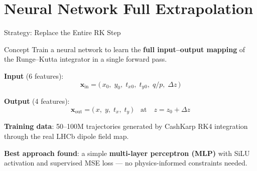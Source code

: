 \documentclass[aspectratio=169, 11pt]{beamer}
\newcommand{\dz}{\Delta z}
\newcommand{\qop}{q/p}
\newcommand{\bvec}[1]{\mathbf{#1}}
\newcommand{\tx}{t_x}
\newcommand{\ty}{t_y}
\begin{document}
\section{Neural Network Full Extrapolation}

\begin{frame}{Strategy: Replace the Entire RK Step}

\begin{block}{Concept}
  Train a neural network to learn the \textbf{full input--output mapping}
  of the Runge--Kutta integrator in a single forward pass.
\end{block}

\vspace{6pt}
\textbf{Input} (6 features):
\begin{equation*}
  \bvec{x}_\text{in} = \bigl(\,x_0,\; y_0,\; \tx{}_0,\; \ty{}_0,\;
  \qop,\; \dz\,\bigr)
\end{equation*}

\textbf{Output} (4 features):
\begin{equation*}
  \bvec{x}_\text{out} = \bigl(\,x,\; y,\; \tx,\; \ty\,\bigr)
  \quad\text{at}\quad z = z_0 + \dz
\end{equation*}

\vspace{6pt}
\textbf{Training data}: 50--100M trajectories generated by CashKarp RK4
integration through the real LHCb dipole field map.

\vspace{6pt}
\textbf{Best approach found}: a simple \textbf{multi-layer perceptron (MLP)}
with SiLU activation and supervised MSE loss --- no physics-informed
constraints needed.
\end{frame}
\end{document}
